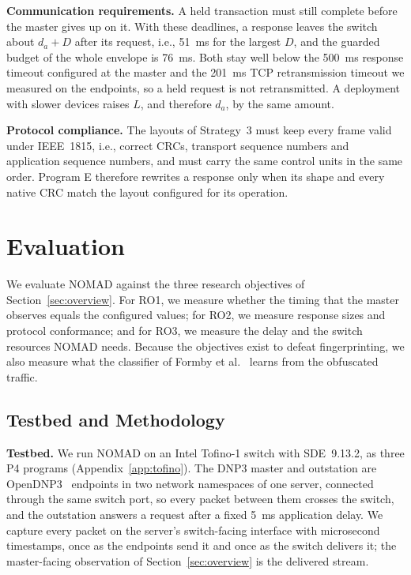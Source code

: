 \documentclass[conference]{IEEEtran}
\begin{document}
\textbf{Communication requirements.} A held transaction must still complete before the master gives up on it. With these deadlines, a response leaves the switch about $d_a + D$ after its request, i.e., 51~ms for the largest $D$, and the guarded budget of the whole envelope is 76~ms. Both stay well below the 500~ms response timeout configured at the master and the 201~ms TCP retransmission timeout we measured on the endpoints, so a held request is not retransmitted. A deployment with slower devices raises $L$, and therefore $d_a$, by the same amount.

\textbf{Protocol compliance.} The layouts of Strategy~3 must keep every frame valid under IEEE~1815, i.e., correct CRCs, transport sequence numbers and application sequence numbers, and must carry the same control units in the same order. Program E therefore rewrites a response only when its shape and every native CRC match the layout configured for its operation.
\section{Evaluation}
\label{sec:evaluation}

We evaluate NOMAD against the three research objectives of Section~\ref{sec:overview}. For RO1, we measure whether the timing that the master observes equals the configured values; for RO2, we measure response sizes and protocol conformance; and for RO3, we measure the delay and the switch resources NOMAD needs. Because the objectives exist to defeat fingerprinting, we also measure what the classifier of Formby et al.~\cite{formby2016} learns from the obfuscated traffic.

\subsection{Testbed and Methodology}

\textbf{Testbed.} We run NOMAD on an Intel Tofino-1 switch with SDE~9.13.2, as three P4 programs (Appendix~\ref{app:tofino}). The DNP3 master and outstation are OpenDNP3~\cite{opendnp3} endpoints in two network namespaces of one server, connected through the same switch port, so every packet between them crosses the switch, and the outstation answers a request after a fixed 5~ms application delay. We capture every packet on the server's switch-facing interface with microsecond timestamps, once as the endpoints send it and once as the switch delivers it; the master-facing observation of Section~\ref{sec:overview} is the delivered stream.
\end{document}
